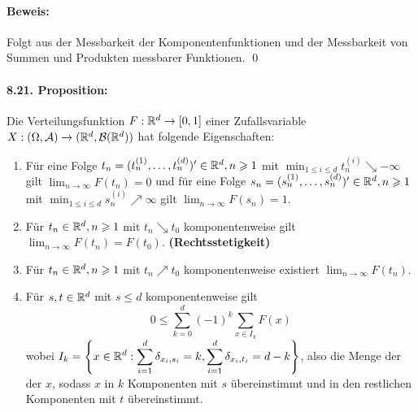 \paragraph{Beweis:}Folgt aus der Messbarkeit der Komponentenfunktionen und der Messbarkeit von Summen und Produkten messbarer Funktionen. \qed

\paragraph{8.21. Proposition:}Die Verteilungsfunktion  $F:\mathbb{R}^d\to[0,1]$ einer Zufallsvariable $X:(\Omega,\mathcal{A})\to(\mathbb{R}^d,\mathcal{B}(\mathbb{R}^d))$ hat folgende Eigenschaften:
\begin{enumerate}[label=(\roman*)]
    \item F\"ur eine Folge $t_n=(t_n^{(1)},\hdots,t_n^{(d)})'\in\mathbb{R}^d,n\geqslant1$ mit $\displaystyle\min_{1\leq i\leq d}t_n^{(i)}\searrow-\infty$ gilt $\displaystyle\lim_{n\to\infty}F(t_n)=0$
    und f\"ur eine Folge $s_n=(s_n^{(1)},\hdots,s_n^{(d)})'\in\mathbb{R}^d,n\geqslant1$ mit $\displaystyle\min_{1\leq i\leq d}s_n^{(i)}\nearrow\infty$ gilt $\displaystyle\lim_{n\to\infty}F(s_n)=1$.
    \item F\"ur $t_n\in\mathbb{R}^d,n\geqslant1$ mit $t_n\searrow t_0$ komponentenweise gilt $\displaystyle\lim_{n\to\infty}F(t_n)=F(t_0)$. \textbf{(Rechtsstetigkeit)}
    \item F\"ur $t_n\in\mathbb{R}^d,n\geqslant1$ mit $t_n\nearrow t_0$ komponentenweise existiert $\displaystyle\lim_{n\to\infty}F(t_n)$.
    \item F\"ur $s,t\in\mathbb{R}^d$ mit $s\leq d$ komponentenweise gilt
    $$0\leq\sum_{k=0}^d(-1)^k\sum_{x\in I_k}F(x)$$
    wobei $I_k=\displaystyle\left\{x\in\mathbb{R}^d:\sum_{i=1}^d\delta_{x_i,s_i}=k,\sum_{i=1}^d\delta_{x_i,t_i}=d-k\right\}$, also die Menge der der $x$, sodass $x$ in $k$ Komponenten mit $s$ \"ubereinstimmt und in den restlichen Komponenten mit $t$ \"ubereinstimmt.
\end{enumerate}

